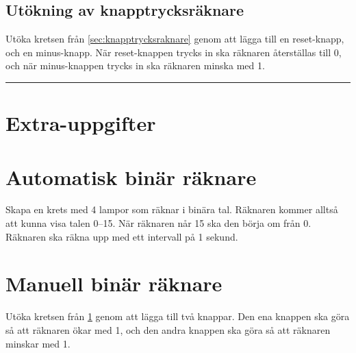 \documentclass[11pt]{article}
\begin{document}
\subsection{Utökning av knapptrycksräknare}\label{sec:utokning}
Utöka kretsen från \ref{sec:knapptrycksraknare} genom att lägga till en
reset-knapp, och en minus-knapp. När reset-knappen trycks in ska räknaren
återställas till 0, och när minus-knappen trycks in ska räknaren minska med 1.



\newpage\hrule
\section*{Extra-uppgifter}

\section{Automatisk binär räknare}\label{sec:binar-raknare}
Skapa en krets med 4 lampor som räknar i binära tal. Räknaren kommer alltså att
kunna visa talen 0--15. När räknaren når 15 ska den börja om från 0. Räknaren
ska räkna upp med ett intervall på 1 sekund.

\section{Manuell binär räknare}\label{sec:manuell-binar-raknare}
Utöka kretsen från \ref{sec:binar-raknare} genom att lägga till två knappar.
Den ena knappen ska göra så att räknaren ökar med 1, och den andra knappen ska
göra så att räknaren minskar med 1.
\end{document}
